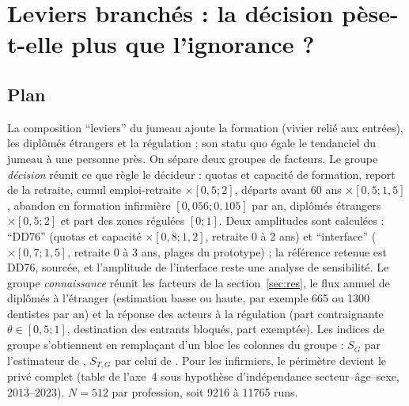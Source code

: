 \documentclass[11pt]{article}
\begin{document}
\section{Leviers branchés : la décision pèse-t-elle plus que l'ignorance ?}\label{sec:lev}
\subsection{Plan}
La composition \enquote{leviers} du jumeau ajoute la formation (vivier relié aux entrées), les diplômés étrangers et
la régulation ; son statu quo égale le tendanciel du jumeau à une personne près\mesure{}. On sépare deux groupes de
facteurs. Le groupe \emph{décision} réunit ce que règle le décideur : quotas et capacité de formation, report de la
retraite, cumul emploi-retraite $\times[0{,}5 ; 2]$, départs avant 60 ans $\times[0{,}5 ; 1{,}5]$, abandon en
formation infirmière $[0{,}056 ; 0{,}105]$ par an\derive{}, diplômés étrangers $\times[0{,}5 ; 2]$ et part des zones
régulées $[0 ; 1]$. Deux amplitudes sont calculées : \enquote{DD76} (quotas et capacité $\times[0{,}8 ; 1{,}2]$,
retraite 0 à 2 ans) et \enquote{interface} ($\times[0{,}7 ; 1{,}5]$, retraite 0 à 3 ans, plages du prototype) ; la
référence retenue est DD76, sourcée, et l'amplitude de l'interface reste une analyse de sensibilité. Le
groupe \emph{connaissance} réunit les facteurs de la section~\ref{sec:res}, le flux annuel de diplômés à l'étranger
(estimation basse ou haute, par exemple 665 ou \num{1300} dentistes par an\derive{}) et la réponse des acteurs à la
régulation (part contraignante $\theta \in [0{,}5 ; 1]$\suppose{}, destination des entrants bloqués, part exemptée).
Les indices de groupe s'obtiennent en remplaçant d'un bloc les colonnes du groupe : $S_G$ par l'estimateur de
\citet{saltelli2010}, $S_{T,G}$ par celui de \citet{jansen1999}. Pour les infirmiers, le périmètre devient le privé
complet (table de l'axe~4 sous hypothèse d'indépendance secteur--âge--sexe, 2013--2023). $N = 512$ par profession,
soit \num{9216} à \num{11765}\mesure{} runs.
\end{document}
